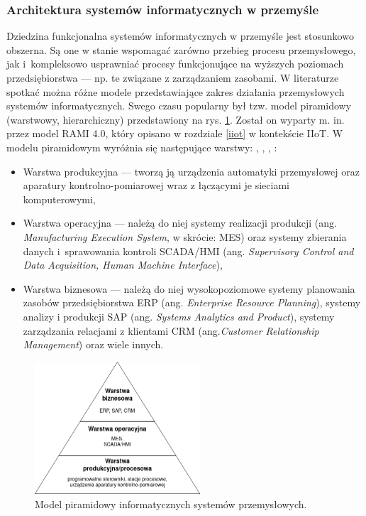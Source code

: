 \documentclass[a4paper, 12pt, twoside]{article}
\begin{document}
\subsubsection{Architektura systemów informatycznych w przemyśle}\label{arch-przemysl}

Dziedzina funkcjonalna systemów informatycznych w przemyśle jest stosunkowo obszerna.
Są one w stanie wspomagać zarówno przebieg procesu przemysłowego,
jak i~kompleksowo usprawniać procesy funkcjonujące na wyższych poziomach przedsiębiorstwa
--- np. te związane z zarządzaniem zasobami. W literaturze spotkać można różne
modele przedstawiające zakres działania przemysłowych systemów informatycznych.
Swego czasu popularny był tzw. model piramidowy (warstwowy, hierarchiczny)
przedstawiony na rys. \ref{fig:piramida}. Został on wyparty m. in.
przez model RAMI 4.0, który opisano w rozdziale \ref{iiot} w kontekście IIoT.
W modelu piramidowym wyróżnia się następujące warstwy:
\cite{systemy-automatyki-przemyslowej}, \cite{isp}, \cite{iiot-cyber-manufacturing-systems}, \cite{intro-to-iot}:
\begin{itemize}
      \itemsep0em
      \item Warstwa produkcyjna --- tworzą ją urządzenia automatyki przemysłowej
            oraz aparatury kontrolno-pomiarowej wraz z łączącymi je sieciami komputerowymi,
      \item Warstwa operacyjna --- należą do niej systemy realizacji produkcji
            (ang. \emph{Manufacturing Execution System}, w skrócie: MES) oraz systemy
            zbierania danych i~sprawowania kontroli SCADA/HMI
            (ang. \emph{Supervisory Control and Data Acquisition, Human Machine Interface}),
      \item Warstwa biznesowa --- należą do niej wysokopoziomowe systemy planowania
            zasobów przedsiębiorstwa ERP (ang. \emph{Enterprise Resource Planning}),
            systemy analizy i produkcji SAP (ang. \emph{Systems Analytics and Product}),
            systemy zarządzania relacjami z klientami CRM (ang.\emph{Customer Relationship Management})
            oraz wiele innych.
\end{itemize}

\begin{figure}[h]
      \centering
      \includegraphics[width=0.55\textwidth]{piramida.png}
      \caption{Model piramidowy informatycznych systemów przemysłowych.}
      \label{fig:piramida}
\end{figure}
\end{document}
